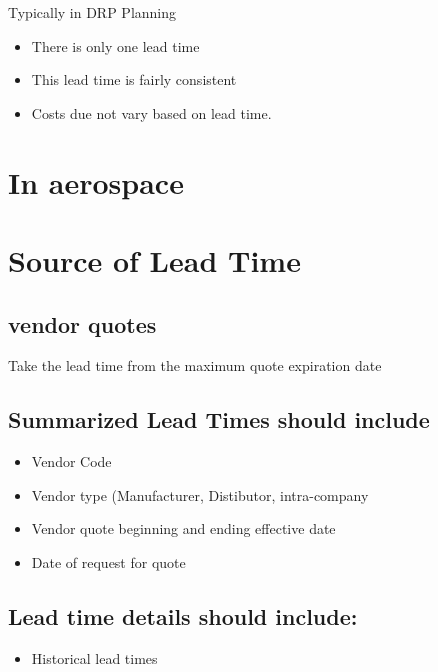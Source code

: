 \documentclass[letterpaper,10pt,english]{sphinxmanual}
\begin{document}
Typically in DRP Planning
\begin{itemize}
\item {} 
There is only one lead time

\item {} 
This lead time is fairly consistent

\item {} 
Costs due not vary based on lead time.

\end{itemize}


\section{In aerospace}
\label{\detokenize{Questions:in-aerospace}}

\section{Source of Lead Time}
\label{\detokenize{Questions:source-of-lead-time}}

\subsection{vendor quotes}
\label{\detokenize{Questions:vendor-quotes}}
Take the lead time from the maximum quote expiration date


\subsection{Summarized Lead Times should include}
\label{\detokenize{Questions:summarized-lead-times-should-include}}\begin{itemize}
\item {} 
Vendor Code

\item {} 
Vendor type (Manufacturer, Distibutor, intra-company

\item {} 
Vendor quote beginning and ending effective date

\item {} 
Date of request for quote

\end{itemize}


\subsection{Lead time details should include:}
\label{\detokenize{Questions:lead-time-details-should-include}}\begin{itemize}
\item {} 
Historical lead times

\end{itemize}
\end{document}
